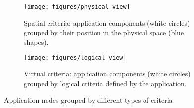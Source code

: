 





\begin{figure}[t!]
	\centering
	\begin{subfigure}[b]{0.4\textwidth}
		\centering
		\texttt{[image: figures/physical\_view]}
		\caption{Spatial criteria: application components (white circles) grouped by their position in the physical space (blue shapes).}
		\label{fig:spatial_criteria}
	\end{subfigure}%
	
	\begin{subfigure}[b]{0.4\textwidth}
		\centering
		\texttt{[image: figures/logical\_view]}
		\caption{Virtual criteria: application components (white circles) grouped by logical criteria defined by the application.}
		\label{fig:virtual_criteria}
	\end{subfigure}
	\caption{Application nodes grouped by different types of criteria}
	\label{fig:grouping_criteria}
\end{figure}


